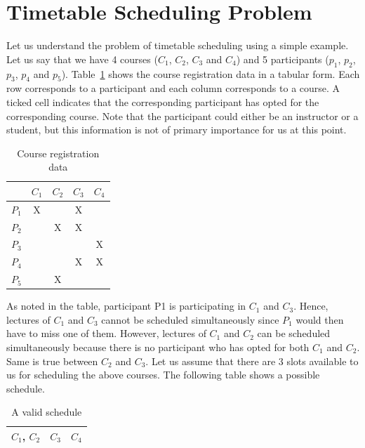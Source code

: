 \documentclass[11pt,a4paper]{article}
\begin{document}
\section{Timetable Scheduling Problem}
\begin{myex} \label{ex:1}
Let us understand the problem of timetable scheduling using a simple example. Let us say that we have 4 courses ($C_1$, $C_2$, $C_3$ and $C_4$) and 5 participants ($p_1$, $p_2$, $p_3$, $p_4$ and $p_5$). Table~\ref{t:1} shows the course registration data in a tabular form. Each row corresponds to a participant and each column corresponds to a course. A ticked cell indicates that the corresponding participant has opted for the corresponding course. Note that the participant could either be an instructor or a student, but this information is not of primary importance for us at this point.

\begin{table}
\begin{center}

\begin{tabular}{| c | c | c | c | c |}
\hline
 & $C_1$ & $C_2$ & $C_3$& $C_4$ \\
\hline
\hline
 $P_1$ & X & & X & \\
\hline
 $P_2$ & & X & X & \\
\hline
 $P_3$ & & & & X \\
\hline
 $P_4$ & & & X & X\\
\hline
 $P_5$ & & X & & \\
\hline
\end{tabular}
\caption{Course registration data}
 \label{t:1}
 \end{center}

\end{table}


As noted in the table, participant P1 is participating in $C_1$ and $C_3$. Hence, lectures of $C_1$ and $C_3$ cannot be scheduled simultaneously since $P_1$ would then have to miss one of them. However, lectures of $C_1$ and $C_2$ can be scheduled simultaneously because there is no participant who has opted for both $C_1$ and $C_2$. Same is true between $C_2$ and $C_3$. Let us assume that there are 3 slots available to us for scheduling the above courses. The following table shows a possible schedule.

\begin{table}
\begin{center}

\begin{tabular}{| c | c | c |}
\hline
$C_1$, $C_2$ & $C_3$ & $C_4$ \\
\hline
\end{tabular}
\caption{A valid schedule}
 \label{t:2}
 \end{center}


\end{table}
\end{myex}
\end{document}
